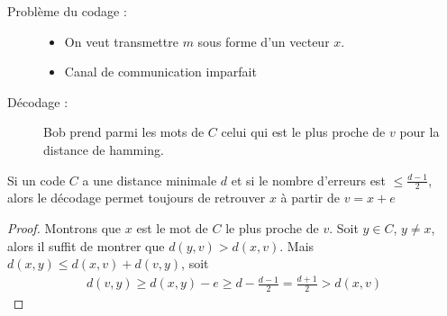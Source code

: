             \begin{description}
                \item[Problème du codage :] 
                \begin{itemize}
                    \item On veut transmettre $m$ sous forme d'un vecteur $x$.
                    \item Canal de communication imparfait 
                \end{itemize}
                \item[Décodage :] Bob prend parmi les mots de $C$ celui qui est le plus proche de $v$ pour la distance de hamming.
            \end{description}
            \begin{theo}
                Si un code $C$ a une distance minimale $d$ et si le nombre d'erreurs est $\leq \frac{d - 1}2$, alors le décodage permet toujours de retrouver $x$ à partir de $v = x + e$
            \end{theo}
            \begin{proof}
                Montrons que $x$ est le mot de $C$ le plus proche de $v$. Soit $y \in C$, $y \neq x$, alors il suffit de montrer que $d(y, v) > d(x, v)$. Mais $d(x, y) \leq d(x, v) + d(v, y)$, soit 
                \begin{align*}
                    d(v, y) \geq d(x, y) - e \geq d - \frac{d - 1}2 = \frac{d + 1}2 > d(x, v)
                \end{align*}
            \end{proof}
                